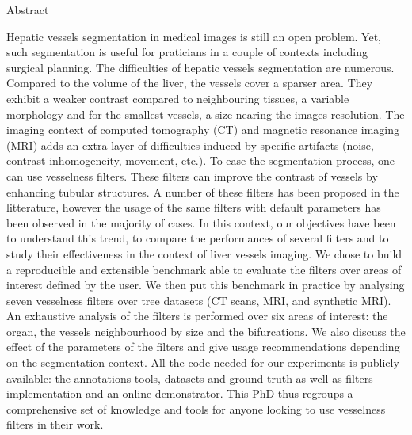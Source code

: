 \vfill

\pagebreak

{Abstract}
\label{sec:abstract-diff}


Hepatic vessels segmentation in medical images is still an open problem. Yet, such segmentation is useful for praticians in a couple of contexts including surgical planning. The difficulties of hepatic vessels segmentation are numerous. Compared to the volume of the liver, the vessels cover a  sparser area. They exhibit a weaker contrast compared to neighbouring tissues, a variable morphology and for the smallest vessels, a size nearing the images resolution. The imaging context of computed tomography (CT) and magnetic resonance imaging (MRI) adds an extra layer of difficulties induced by specific artifacts (noise, contrast inhomogeneity, movement, etc.).
To ease the segmentation process, one can use vesselness filters. These filters can improve the contrast of vessels by enhancing tubular structures. A number of these filters has been proposed in the litterature, however the usage of the same filters with default parameters has been observed in the majority of cases. In this context, our objectives have been to understand this trend, to compare the performances of several filters and to study their effectiveness in the context of liver vessels imaging. We chose to build a reproducible and extensible benchmark able to evaluate the filters over areas of interest defined by the user. We then put this benchmark in practice by analysing seven vesselness filters over tree datasets (CT scans, MRI, and synthetic MRI). An exhaustive analysis of the filters is performed over six areas of interest: the organ, the vessels neighbourhood by size and the bifurcations. We also discuss the effect of the parameters of the filters and give usage recommendations depending on the segmentation context. All the code needed for our experiments is publicly available: the annotations tools, datasets and ground truth as well as filters implementation and an online demonstrator. This PhD thus regroups a comprehensive set of knowledge and tools for anyone looking to use vesselness filters in their work. 

